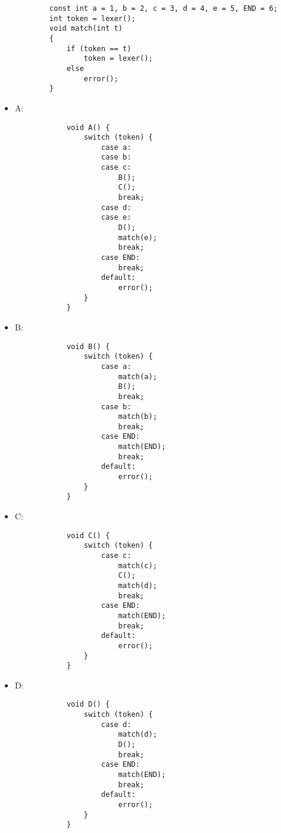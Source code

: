 \documentclass[12pt, A4]{article}
\begin{document}
	\begin{itemize}
        \begin{verbatim}
        const int a = 1, b = 2, c = 3, d = 4, e = 5, END = 6;
        int token = lexer();
        void match(int t)
        {
            if (token == t)
                token = lexer();
            else
                error();
        }
        \end{verbatim}
        
		\item A: 
			\begin{verbatim}
            void A() {
                switch (token) {
                    case a:
                    case b:
                    case c:
                        B();
                        C();
                        break;
                    case d:
                    case e:
                        D();
                        match(e);
                        break;
                    case END:
                        break;
                    default:
                        error();
                }
            }
			\end{verbatim}
        \newpage
		\item B:
            \begin{verbatim}
            void B() {
                switch (token) {
                    case a:
                        match(a);
                        B();
                        break;
                    case b:
                        match(b);
                        break;
                    case END:
                        match(END);
                        break;
                    default:
                        error();
                }
            }
            \end{verbatim}
		\item C:
            \begin{verbatim}
            void C() {
                switch (token) {
                    case c:
                        match(c);
                        C();
                        match(d);
                        break;
                    case END:
                        match(END);
                        break;
                    default:
                        error();
                }
            }
            \end{verbatim}
        \newpage
		\item D:
            \begin{verbatim}
            void D() {
                switch (token) {
                    case d:
                        match(d);
                        D();
                        break;
                    case END:
                        match(END);
                        break;
                    default:
                        error();
                }
            }
            \end{verbatim}
	\end{itemize}
	
\end{document}
